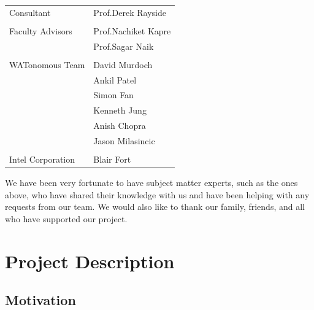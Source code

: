 \documentclass{uw-ece-wkrpt}
\begin{document}
\begin{onehalfspacing}
\begin{flushleft}
\begin{tabular}{l@{\hskip 3cm}l}
    Consultant       & Prof.\@ Derek Rayside \\
    \\
    Faculty Advisors & Prof.\@ Nachiket Kapre \\
                     & Prof.\@ Sagar Naik \\
    \\
    WATonomous Team  & David Murdoch \\
                     & Ankil Patel \\
                     & Simon Fan \\
                     & Kenneth Jung \\
                     & Anish Chopra \\
                     & Jason Milasincic \\
    \\
    Intel Corporation & Blair Fort \\
\end{tabular}
\end{flushleft}

We have been very fortunate to have subject matter experts, such as the ones above, who have shared their knowledge with us and have been helping with any requests from our team. We would also like to thank our family, friends, and all who have supported our project.

\end{onehalfspacing}

\tableofcontents
\listoffigures
\listoftables
{}
\lstlistoflistings

\mainmatter
\glsresetall

\section{Project Description}

\subsection{Motivation}
\end{document}
